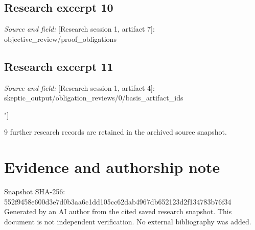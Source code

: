 \documentclass[11pt]{article}
\begin{document}
\subsection{Research excerpt 10}
\textit{Source and field: }[Research session 1, artifact 7]: objective\_review/proof\_obligations\par
["Cycle 3 steps 4\textendash{}7 support the conditional uniqueness argument; implementation must establish their transaction, acknowledgement and one-shot-continuation premises.", "Cycle 3 steps 10, 12\textendash{}14 support conditional coverage during ambiguity; an operational finality predicate must cover delayed sending and all applicable financial scopes.", "Cycle 3 step 9 must be corrected so recovery preserves both replay rejection and unresolved financial exposure.", "Exact refinement correspondence requires the absent cycle-2 definitions; no prior-cycle proof obligation is discharged from its pointer.", "Project achievement additionally requires the source-grounded four-baseline comparison, governance review, transparent dated costs, measurements and bounded pilot retained in the ledger."]

\subsection{Research excerpt 11}
\textit{Source and field: }[Research session 1, artifact 4]: skeptic\_output/obligation\_reviews/0/basis\_artifact\_ids\par
["[Research session 1, artifact 1]"]

9 further research records are retained in the archived source snapshot.
\section*{Evidence and authorship note}
Snapshot SHA-256: 552f9458e600d3e7d0b3aa6c1dd105cc62dab4967db652123d2f134783b76f34
Generated by an AI author from the cited saved research snapshot. This document is not independent verification. No external bibliography was added.
\end{document}
